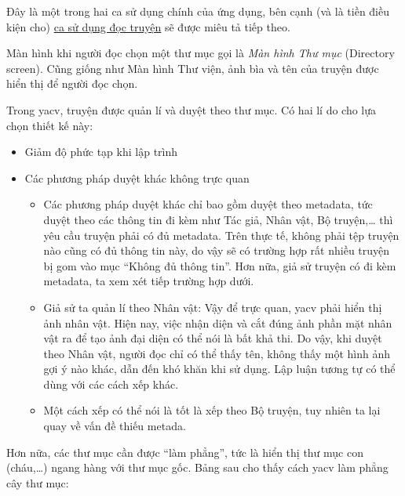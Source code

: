 \documentclass[../../thesis]{subfiles}
\begin{document}
Đây là một trong hai ca sử dụng chính của ứng dụng, bên cạnh (và là tiền điều
kiện cho) \hyperref[sec:read-comic]{ca sử dụng đọc truyện} sẽ được miêu tả tiếp
theo.

Màn hình khi người đọc chọn một thư mục gọi là \emph{Màn hình Thư mục}
(Directory screen). Cũng giống như Màn hình Thư viện, ảnh bìa và tên của truyện
được hiển thị để người đọc chọn.

Trong yacv, truyện được quản lí và duyệt theo thư mục. Có hai lí do cho lựa chọn
thiết kế này:

\begin{itemize}
    \item
        Giảm độ phức tạp khi lập trình
    \item
        Các phương pháp duyệt khác không trực quan

        \begin{itemize}
            \item
                Các phương pháp duyệt khác chỉ bao gồm duyệt theo metadata, tức
                duyệt theo các thông tin đi kèm như Tác giả, Nhân vật, Bộ
                truyện,\ldots{} thì yêu cầu truyện phải có đủ metadata. Trên
                thực tế, không phải tệp truyện nào cũng có đủ thông tin này, do
                vậy sẽ có trường hợp rất nhiều truyện bị gom vào mục ``Không đủ
                thông tin''. Hơn nữa, giả sử truyện có đi kèm metadata, ta xem
                xét tiếp trường hợp dưới.
            \item
                Giả sử ta quản lí theo Nhân vật: Vậy để trực quan, yacv phải
                hiển thị ảnh nhân vật. Hiện nay, việc nhận diện và cắt đúng ảnh
                phần mặt nhân vật ra để tạo ảnh đại diện có thể nói là bất khả
                thi. Do vậy, khi duyệt theo Nhân vật, người đọc chỉ có thể thấy
                tên, không thấy một hình ảnh gợi ý nào khác, dẫn đến khó khăn
                khi sử dụng. Lập luận tương tự có thể dùng với các cách xếp
                khác.
            \item
                Một cách xếp có thể nói là tốt là xếp theo Bộ truyện, tuy nhiên
                ta lại quay về vấn đề thiếu metada.
        \end{itemize}
\end{itemize}

Hơn nữa, các thư mục cần được ``làm phẳng'', tức là hiển thị thư mục con
(cháu,\ldots) ngang hàng với thư mục gốc. Bảng sau cho thấy cách yacv làm phẳng
cây thư mục:

\end{document}
